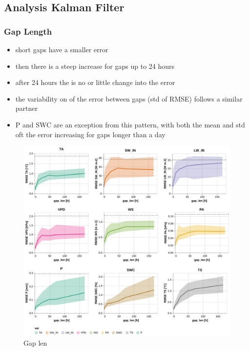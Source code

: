 \documentclass{article}
\newcommand{\imgwidth}{6in}
\let\Oldsubsection\subsection
\renewcommand{\subsection}{\FloatBarrier\Oldsubsection}
\begin{document}


\subsection{Analysis Kalman Filter}

\subsubsection{Gap Length}

\begin{itemize}
    \item short gaps have a smaller error
    \item then there is a steep increase for gaps up to 24 hours
    \item after 24 hours the is no or little change into the error
    \item the variability on of the error between gaps (std of RMSE) follows a similar partner
    \item P and SWC are an exception from this pattern, with both the mean and std oft the error increasing for gaps longer than a day
\end{itemize}

\begin{figure}
\centerline{\includegraphics[width=\imgwidth]{gap_len}}
\caption{Gap len}
\label{fig:gap_len}
\end{figure}
\end{document}
